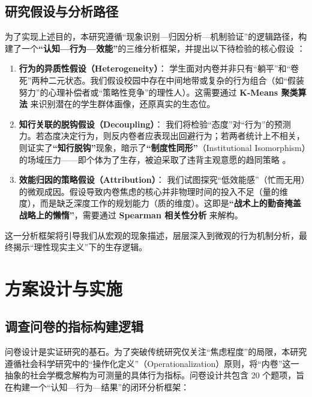 \documentclass[win,thesis]{hustreport} %
\begin{document}
\subsection{研究假设与分析路径}
为了实现上述目的，本研究遵循“现象识别—归因分析—机制验证”的逻辑路径，构建了一个\textbf{“认知—行为—效能”}的三维分析框架，并提出以下待检验的核心假设 ：

\begin{enumerate}
	\item \textbf{行为的异质性假设（Heterogeneity）}：
	学生面对内卷并非只有“躺平”和“卷死”两种二元状态。我们假设校园中存在中间地带或复杂的行为组合（如“假装努力”的心理补偿者或“策略性竞争”的理性人）。这需要通过 \textbf{K-Means 聚类算法} 来识别潜在的学生群体画像，还原真实的生态位。
	
	\item \textbf{知行关联的脱钩假设（Decoupling）}：
我们将检验“态度”对“行为”的预测力。若态度决定行为，则反内卷者应表现出回避行为；若两者统计上不相关，则证实了\textbf{“知行脱钩”}现象，暗示了\textbf{“制度性同形”}（Institutional Isomorphism）的场域压力——即个体为了生存，被迫采取了违背主观意愿的趋同策略 。
	
	\item \textbf{效能归因的策略假设（Attribution）}：
我们试图探究“低效能感”（忙而无用）的微观成因。假设导致内卷焦虑的核心并非物理时间的投入不足（量的维度），而是缺乏深度工作的规划能力（质的维度）。这即是\textbf{“战术上的勤奋掩盖战略上的懒惰”}，需要通过 \textbf{Spearman 相关性分析} 来解构。
\end{enumerate}

这一分析框架将引导我们从宏观的现象描述，层层深入到微观的行为机制分析，最终揭示“理性现实主义”下的生存逻辑。

\newpage
\section{方案设计与实施}

\subsection{调查问卷的指标构建逻辑}
问卷设计是实证研究的基石。为了突破传统研究仅关注“焦虑程度”的局限，本研究遵循社会科学研究中的“操作化定义”（Operationalization）原则，将“内卷”这一抽象的社会学概念解构为可测量的具体行为指标。问卷设计共包含 20 个题项，旨在构建一个“认知—行为—结果”的闭环分析框架：
\end{document}
